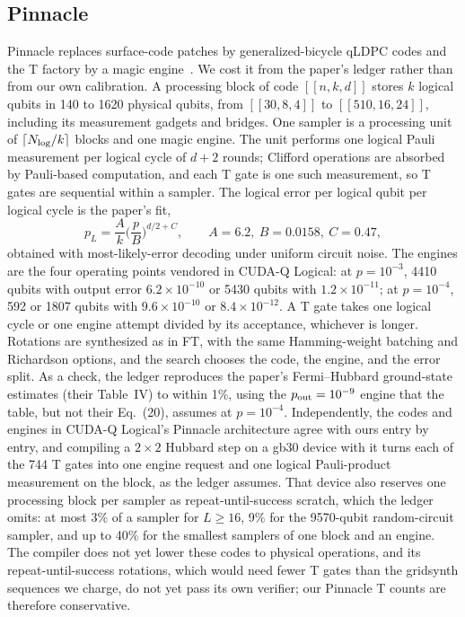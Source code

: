 \documentclass[11pt]{article}
\begin{document}
\subsection{Pinnacle}\label{sec:pinnacle}
Pinnacle replaces surface-code patches by generalized-bicycle qLDPC codes and
the T factory by a magic engine~\cite{webster2026pinnacle}. We cost it from the
paper's ledger rather than from our own calibration. A processing block of code
$[[n,k,d]]$ stores $k$ logical qubits in 140 to 1620 physical qubits, from
$[[30,8,4]]$ to $[[510,16,24]]$, including its measurement gadgets and bridges.
One sampler is a processing unit of $\lceil N_{\rm log}/k\rceil$ blocks and one
magic engine. The unit performs one logical Pauli measurement per logical cycle
of $d+2$ rounds; Clifford operations are absorbed by Pauli-based computation,
and each T gate is one such measurement, so T gates are sequential within a
sampler. The logical error per logical qubit per logical cycle is the paper's
fit,
\begin{equation}\label{eq:pinnacle}
 p_L=\frac{A}{k}\Big(\frac{p}{B}\Big)^{d/2+C},\qquad A=6.2,\ B=0.0158,\ C=0.47,
\end{equation}
obtained with most-likely-error decoding under uniform circuit noise. The
engines are the four operating points vendored in CUDA-Q Logical: at
$p=10^{-3}$, 4410 qubits with output error $6.2\times10^{-10}$ or 5430 qubits
with $1.2\times10^{-11}$; at $p=10^{-4}$, 592 or 1807 qubits with
$9.6\times10^{-10}$ or $8.4\times10^{-12}$. A T gate takes one logical cycle
or one engine attempt divided by its acceptance, whichever is longer. Rotations
are synthesized as in FT, with the same Hamming-weight batching and
Richardson options, and the search chooses the code, the engine, and the error
split. As a check, the ledger reproduces the paper's Fermi--Hubbard ground-state
estimates (their Table~IV) to within 1\%, using the $p_{\rm out}=10^{-9}$
engine that the table, but not their Eq.~(20), assumes at $p=10^{-4}$. Independently, the
codes and engines in CUDA-Q Logical's Pinnacle architecture agree with ours
entry by entry, and compiling a $2\times2$ Hubbard step on a gb30 device with
it turns each of the 744 T gates into one engine request and one logical
Pauli-product measurement on the block, as the ledger assumes. That device
also reserves one processing block per sampler as repeat-until-success
scratch, which the ledger omits: at most 3\% of a sampler for
$L\geq16$, 9\% for the 9570-qubit random-circuit sampler, and up to 40\% for
the smallest samplers of one block and an engine. The compiler does not yet lower
these codes to physical operations, and its repeat-until-success rotations,
which would need fewer T gates than the gridsynth sequences we charge, do not
yet pass its own verifier; our Pinnacle T counts are therefore conservative.
\end{document}
